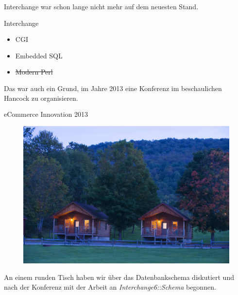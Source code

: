 Interchange war schon lange nicht mehr auf dem neuesten Stand.

\begin{frame}{Interchange}
  \begin{itemize}
    \item CGI
    \item Embedded SQL
    \item \sout{Modern Perl}
  \end{itemize}
\end{frame}

Das war auch ein Grund, im Jahre 2013 eine Konferenz im beschaulichen
Hancock zu organisieren.


\begin{frame}{eCommerce Innovation 2013}
\begin{figure}[!ht]
\centering
\includegraphics[width=1\linewidth]{img/lodges-at-night.jpg}
\end{figure}
\end{frame}

An einem runden Tisch haben wir über das Datenbankschema diskutiert und nach
der Konferenz mit der Arbeit an \textit{Interchange6::Schema} begonnen.



